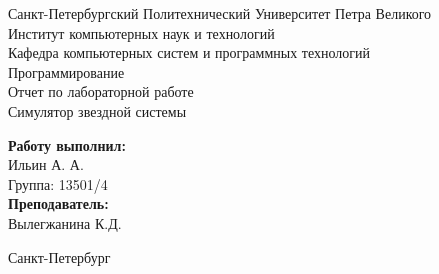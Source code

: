 \documentclass[a4paper]{article}
\begin{document}

\begin{titlepage}	%

	\begin{center}		%

		\large Санкт-Петербургский Политехнический Университет Петра Великого\\
		\large Институт компьютерных наук и технологий \\
		\large Кафедра компьютерных систем и программных технологий\\[6cm]
		
		\huge Программирование\\[0.5cm] %
		\large Отчет по лабораторной работе\\[0.1cm]
		\large Симулятор звездной системы\\[5cm]

	\end{center}


	\begin{flushright} %
		\begin{minipage}{0.25\textwidth} %
			\begin{flushleft} %

				\large\textbf{Работу выполнил:}\\
				\large Ильин А. А.\\
				\large {Группа:} 13501/4\\
				
				\large \textbf{Преподаватель:}\\
				\large Вылегжанина К.Д.

			\end{flushleft}
		\end{minipage}
	\end{flushright}
	
	\vfill %

	\begin{center}
	\large Санкт-Петербург\\
	\large \the\year %
	\end{center} %

\thispagestyle{empty} %
\end{titlepage} %
\end{document}
